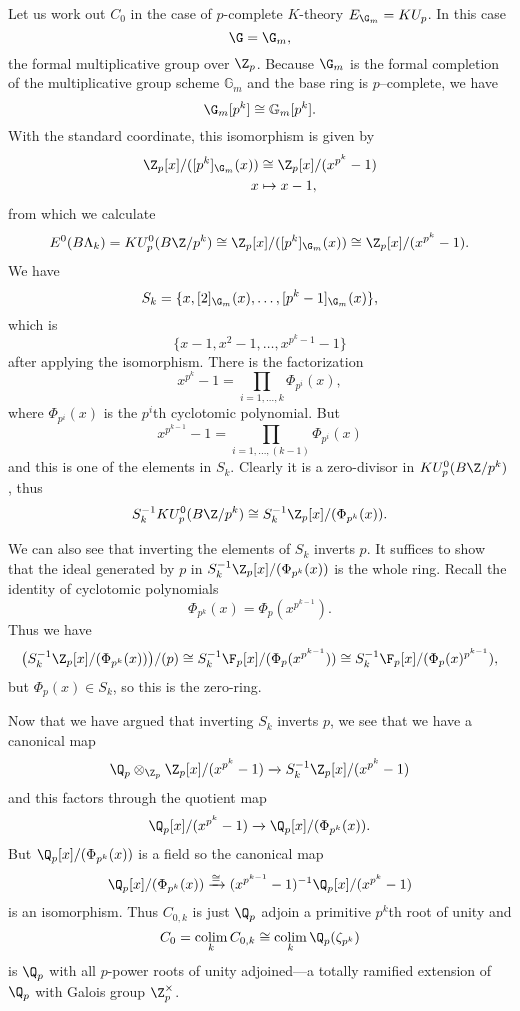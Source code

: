 \begin{example} \label{padicktheory}
Let us work out \(C_0\) in the case of $p$-complete $K$-theory \(E_{\G_m} = KU_p\). In this case 
\[
\G = \G_m,
\]
the formal multiplicative group over \(\Z_p\).  Because \(\G_m\) is the formal completion of the multiplicative group scheme \(\mathbb G_m\) and the base ring is \(p\)--complete, we have
\[
\G_m[p^k] \cong \mathbb{G}_m[p^k].
\]
With the standard coordinate, this isomorphism is given by
\begin{align*}
\Z_p[x]/([p^k]_{\G_m}(x)) & \cong \Z_p[x]/(x^{p^k}-1) \\
x & \mapsto x-1,
\end{align*}
from which we calculate 
\[
E^0(B\Lk) = KU_{p}^0(B\Z/p^k) \cong \Z_p[x]/([p^k]_{\G_m}(x)) \cong \Z_p[x]/(x^{p^k}-1).
\]
We have
\[
S_k = \{x,[2]_{\G_m}(x),\ldots, [p^k-1]_{\G_m}(x)\},
\]
which is
\[
\{x-1,x^2-1, \ldots, x^{p^k-1}-1\}
\]
after applying the isomorphism.
There is the factorization
\[
x^{p^k}-1 = \prod_{i=1,\ldots,k}\Phi_{p^i}(x),
\]
where \(\Phi_{p^i}(x)\) is the \(p^i\)th cyclotomic polynomial. But
\[
x^{p^{k-1}}-1 = \prod_{i=1,\ldots,(k-1)}\Phi_{p^i}(x)
\]
and this is one of the elements in \(S_k\). Clearly it is a zero-divisor in \(KU_{p}^0(B\Z/p^k)\), thus
\[
S_{k}^{-1}KU_{p}^0(B\Z/p^k) \cong S_{k}^{-1}\Z_p[x]/(\Phi_{p^k}(x)).
\]

We can also see that inverting the elements of \(S_{k}\) inverts \(p\). It suffices to show that the ideal generated by \(p\) in \(S_{k}^{-1}\Z_p[x]/(\Phi_{p^k}(x))\) is the whole ring. Recall the identity of cyclotomic polynomials 
\[
\Phi_{p^k}(x) = \Phi_p(x^{p^{k-1}}).
\]
Thus we have
\[
\big ( S_{k}^{-1}\Z_p[x]/(\Phi_{p^k}(x)) \big )/(p) \cong S_{k}^{-1}\F_p[x]/(\Phi_{p}(x^{p^{k-1}})) \cong S_{k}^{-1}\F_p[x]/(\Phi_{p}(x)^{p^{k-1}}),
\]
but \(\Phi_{p}(x) \in S_k\), so this is the zero-ring.

Now that we have argued that inverting \(S_k\) inverts \(p\), we see that we have a canonical map
\[
\Q_p \otimes_{\Z_p} \Z_p[x]/(x^{p^k}-1) \xrightarrow{} S_{k}^{-1}\Z_p[x]/(x^{p^k}-1) 
\]
and this factors through the quotient map
\[
\Q_p[x]/(x^{p^k}-1) \xrightarrow{} \Q_p[x]/(\Phi_{p^k}(x)).
\]
But \(\Q_p[x]/(\Phi_{p^k}(x))\) is a field so the canonical map
\[
\Q_p[x]/(\Phi_{p^k}(x)) \xrightarrow{\cong} (x^{p^{k-1}}-1)^{-1}\Q_p[x]/(x^{p^k}-1)
\]
is an isomorphism. Thus \(C_{0,k}\) is just \(\Q_p\) adjoin a primitive \(p^k\)th root of unity and
\[
C_0 = \colim_k C_{0,k} \cong \colim_k \Q_p(\zeta_{p^k})
\]
is \(\Q_p\) with all \(p\)-power roots of unity adjoined---a totally ramified extension of \(\Q_p\) with Galois group \(\Z_{p}^{\times}\).
\end{example}

